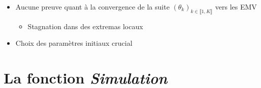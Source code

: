 \documentclass[11pt]{beamer}
\begin{document}
	\begin{frame}
		\begin{block}{}
			\begin{itemize}
				\item Aucune preuve quant à la convergence de la suite $(\theta_k)_{k \in \llbracket 1, K \rrbracket}$ vers les EMV
				\begin{itemize}
					\item Stagnation dans des extremas locaux
				\end{itemize}
				\item Choix des paramètres initiaux crucial
			\end{itemize}
		\end{block}	
	\end{frame}

\section{La fonction \textit{Simulation}}
	
\end{document}
